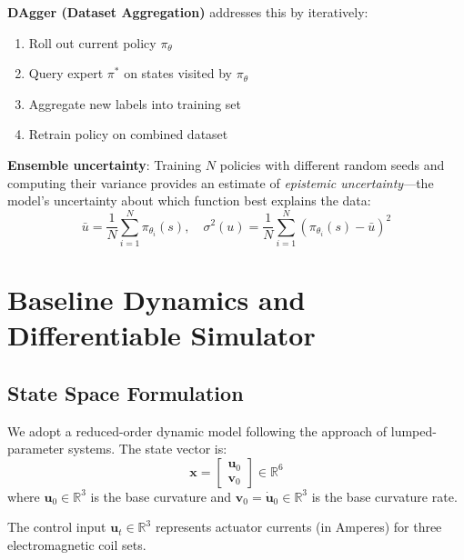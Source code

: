 \documentclass[conference]{IEEEtran}
\begin{document}
\textbf{DAgger (Dataset Aggregation)} addresses this by iteratively:
\begin{enumerate}
\item Roll out current policy $\pi_\theta$
\item Query expert $\pi^*$ on states visited by $\pi_\theta$
\item Aggregate new labels into training set
\item Retrain policy on combined dataset
\end{enumerate}

\textbf{Ensemble uncertainty}: Training $N$ policies with different random seeds and computing their variance provides an estimate of \emph{epistemic uncertainty}---the model's uncertainty about which function best explains the data:
\begin{equation}
\bar{u} = \frac{1}{N}\sum_{i=1}^N \pi_{\theta_i}(s), \quad \sigma^2(u) = \frac{1}{N}\sum_{i=1}^N (\pi_{\theta_i}(s) - \bar{u})^2
\end{equation}

\section{Baseline Dynamics and Differentiable Simulator}

\subsection{State Space Formulation}

We adopt a reduced-order dynamic model following the approach of lumped-parameter systems. The state vector is:
\begin{equation}
\mathbf{x} = \begin{bmatrix} \mathbf{u}_0 \\ \mathbf{v}_0 \end{bmatrix} \in \mathbb{R}^6
\end{equation}
where $\mathbf{u}_0 \in \mathbb{R}^3$ is the base curvature and $\mathbf{v}_0 = \dot{\mathbf{u}}_0 \in \mathbb{R}^3$ is the base curvature rate.

The control input $\mathbf{u}_t \in \mathbb{R}^3$ represents actuator currents (in Amperes) for three electromagnetic coil sets.
\end{document}
